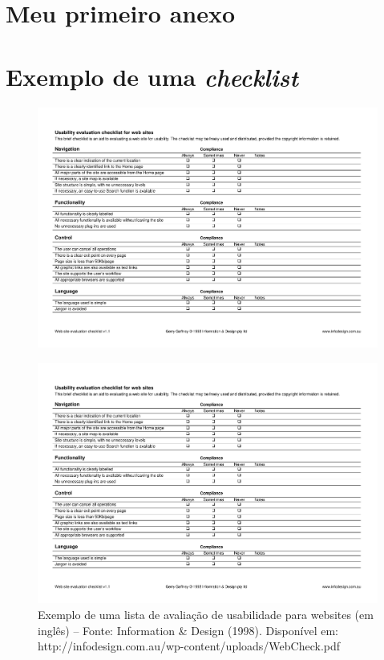 \documentclass[portuguese,oneside]{tcc}
\begin{document}
\chapter{Meu primeiro anexo}
\renewcommand{\figurename}{Apêndice}

\chapter{\label{apnd:checklist}Exemplo de uma \emph{checklist}}
\begin{figure}[H]
	\centering\includegraphics[page=1,width=1\textwidth]{pdf/apnd-webchecklist.pdf}
\end{figure}
\begin{figure}[H]
	\centering\includegraphics[page=2,width=1\textwidth]{pdf/apnd-webchecklist.pdf}
	\caption[Exemplo de uma \emph{Checklist}]{\label{apnd:checklist}Exemplo de uma lista de avaliação de usabilidade para websites (em inglês) -- Fonte: Information \& Design (1998). Disponível em: http://infodesign.com.au/wp-content/uploads/WebCheck.pdf}
\end{figure}

\end{document}
